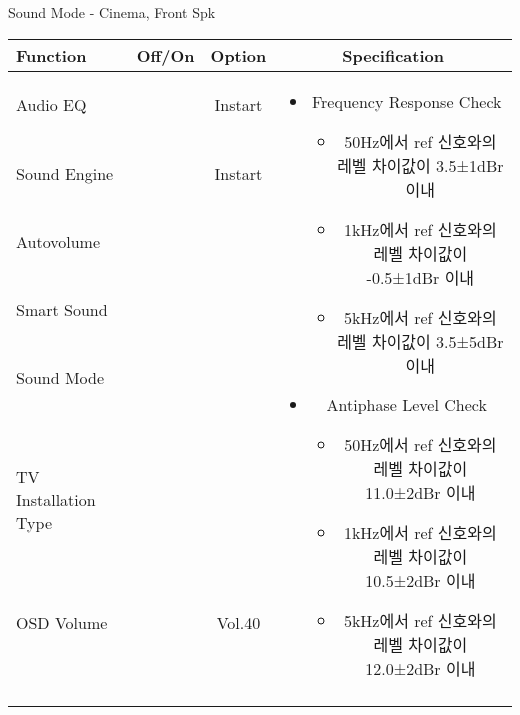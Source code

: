 \begin{frame}[t]{Sound Mode - Cinema, Front Spk}
\begin{tiny}
\begin{tabular}{@{}lccc@{}}
\toprule
Function & Off/On & Option & Specification \\
\midrule
Audio EQ & \color{black}{Off} & Instart &
\multirow{10}{60mm}{
\begin{itemize}
\item Frequency Response Check
	\begin{itemize}
	\item 50Hz에서 ref 신호와의 레벨 차이값이 3.5±1dBr 이내
	\item 1kHz에서 ref 신호와의 레벨 차이값이 -0.5±1dBr 이내	
	\item 5kHz에서 ref 신호와의 레벨 차이값이 3.5±5dBr 이내
	\end{itemize}
\item Antiphase Level Check
	\begin{itemize}
	\item 50Hz에서 ref 신호와의 레벨 차이값이 11.0±2dBr 이내
	\item 1kHz에서 ref 신호와의 레벨 차이값이 10.5±2dBr 이내
	\item 5kHz에서 ref 신호와의 레벨 차이값이 12.0±2dBr 이내
	\end{itemize}
\end{itemize}
} \\
Sound Engine & \color{blue}{On} & Instart & \\
Autovolume & \color{black}{Off} & & \\
Smart Sound & \color{black}{Off} & & \\
Sound Mode & \color{blue}{On} & \color{blue}{Cinema} & \\
TV Installation Type & \color{blue}{On} & \color{black}{Standtype1} & \\
OSD Volume & \color{blue}{On} & Vol.40 & \\
& & & \\
& & & \\
& & & \\
& & & \\
\midrule
\end{tabular}
\end{tiny}


\end{frame}



